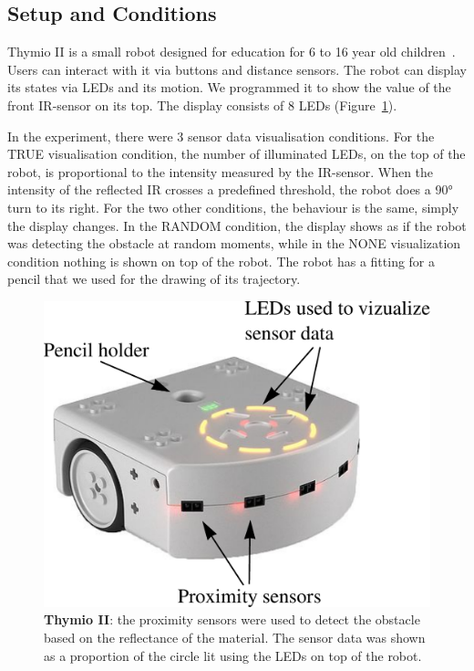 \documentclass{sig-alternate}
\begin{document}
\subsection{Setup and Conditions}

Thymio II is a small robot designed for education for 6 to 16 year old
children~\cite{magnenat2012programming, riedo2012two}. Users can interact with
it via buttons and distance sensors. The robot can display its states via 
LEDs and its motion. We programmed it to show the value of the front IR-sensor
on its top. The display consists of 8 LEDs (Figure~\ref{thymio}).

In the experiment, there were 3 sensor data visualisation conditions.  For the
{\sf TRUE} visualisation condition, the number of illuminated LEDs, on the top of the
robot, is proportional to the intensity measured by the IR-sensor. When the
intensity of the reflected IR crosses a predefined threshold, the robot does a
90° turn to its right. For the two other conditions, the behaviour is the same,
simply the display changes. In the {\sf RANDOM} condition, the display shows as if the
robot was detecting the obstacle at random moments, while in the {\sf NONE}
visualization condition nothing is shown on top of the robot. The robot has a
fitting for a pencil that we used for the drawing of its trajectory.

\begin{figure}
    \centering
    \includegraphics[width=0.7\linewidth]{thymio}
    \caption{\small \textbf{Thymio II}: the proximity sensors were used to
    detect the obstacle based on the reflectance of the material. The sensor
    data was shown as a proportion of the circle lit using the LEDs on top of the
    robot.}

    \label{thymio}
\end{figure}
\end{document}
